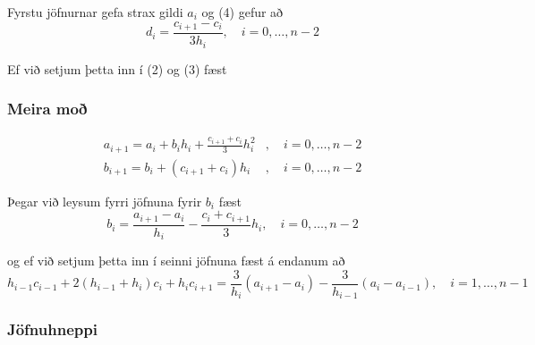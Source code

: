 \documentclass[icelandic,a4paper,12pt]{article}
\begin{document}
Fyrstu jöfnurnar gefa strax gildi $a_i$ og (4) gefur að
\begin{equation*}
	d_i = \frac{c_{i+1}-c_i}{3h_i}, \quad i=0,\ldots,n-2
\end{equation*}

\pause
Ef við setjum þetta inn í (2) og (3) fæst


\subsubsection{Meira moð} 
\begin{align*}
	a_{i+1} = a_i + b_ih_i + \frac{c_{i+1}+c_i}{3}h_i^2
		&, \quad i=0,\ldots,n-2 \\
	b_{i+1} = b_i + (c_{i+1} + c_i)h_i
		&, \quad i=0,\ldots,n-2
\end{align*}

\pause
\smallskip
Þegar við leysum fyrri jöfnuna fyrir $b_i$ fæst
\begin{equation*}
	b_i = \frac{a_{i+1}-a_i}{h_i}-\frac{c_i+c_{i+1}}{3}h_i
		, \quad i=0,\ldots,n-2
\end{equation*}

\pause
\smallskip
og ef við setjum þetta inn í seinni jöfnuna fæst á endanum að
\begin{equation*}
	h_{i-1}c_{i-1} + 2(h_{i-1}+h_i)c_i + h_ic_{i+1} = 
	\frac{3}{h_i}(a_{i+1}-a_i) 
		- \frac{3}{h_{i-1}}(a_i-a_{i-1})
	, \quad i=1,\ldots,n-1
\end{equation*}


\subsubsection{Jöfnuhneppi} 
\end{document}
